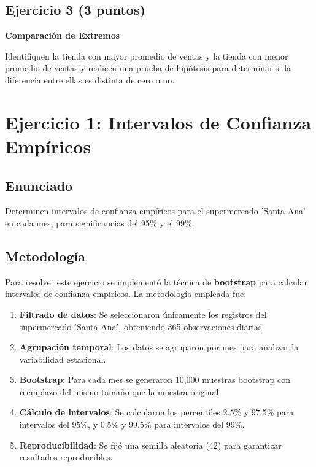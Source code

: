 \documentclass[11pt,a4paper]{article}
\begin{document}
\subsection{Ejercicio 3 (3 puntos)}
\textbf{Comparación de Extremos}

Identifiquen la tienda con mayor promedio de ventas y la tienda con menor promedio de ventas y realicen una prueba de hipótesis para determinar si la diferencia entre ellas es distinta de cero o no.


\newpage


\section{Ejercicio 1: Intervalos de Confianza Empíricos}

\subsection{Enunciado}
Determinen intervalos de confianza empíricos para el supermercado 'Santa Ana' en cada mes, para significancias del 95\% y el 99\%.

\subsection{Metodología}

Para resolver este ejercicio se implementó la técnica de \textbf{bootstrap} para calcular intervalos de confianza empíricos. La metodología empleada fue:

\begin{enumerate}
    \item \textbf{Filtrado de datos}: Se seleccionaron únicamente los registros del supermercado 'Santa Ana', obteniendo 365 observaciones diarias.
    \item \textbf{Agrupación temporal}: Los datos se agruparon por mes para analizar la variabilidad estacional.
    \item \textbf{Bootstrap}: Para cada mes se generaron 10,000 muestras bootstrap con reemplazo del mismo tamaño que la muestra original.
    \item \textbf{Cálculo de intervalos}: Se calcularon los percentiles 2.5\% y 97.5\% para intervalos del 95\%, y 0.5\% y 99.5\% para intervalos del 99\%.
    \item \textbf{Reproducibilidad}: Se fijó una semilla aleatoria (42) para garantizar resultados reproducibles.
\end{enumerate}
\end{document}
